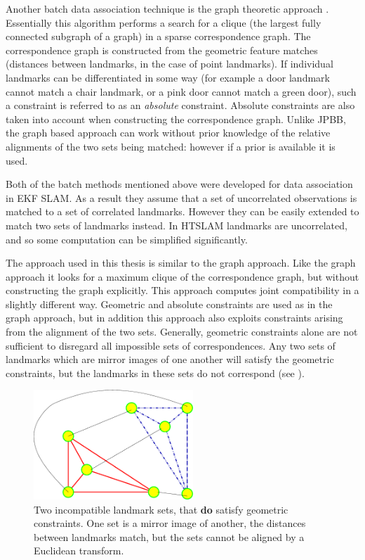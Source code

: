 Another batch data association technique is the graph theoretic
approach \cite{tardos02:_mappin_local_indoor_envir_using_sonar_data}.
Essentially this algorithm performs a search for a clique (the largest
fully connected subgraph of a graph) in a sparse correspondence graph.
The correspondence graph is constructed from the geometric feature
matches (distances between landmarks, in the case of point landmarks).
If individual landmarks can be differentiated in some way (for example
a door landmark cannot match a chair landmark, or a pink door cannot match
a green door), such a constraint is referred to as an {\it absolute}
constraint. Absolute constraints are also taken into account when
constructing the correspondence graph. Unlike JPBB, the graph based
approach can work without prior knowledge of the relative alignments
of the two sets being matched: however if a prior is available it is
used.

Both of the batch methods mentioned above were developed for data
association in EKF SLAM. As a result they assume that a set of
uncorrelated observations is matched to a set of correlated
landmarks. However they can be easily extended to match two sets of
landmarks instead. In HTSLAM landmarks are uncorrelated, and so some
computation can be simplified significantly.

The approach used in this thesis is similar to the graph approach.
Like the graph approach it looks for a maximum clique of the
correspondence graph, but without constructing the graph explicitly.
This approach computes joint compatibility in a slightly different
way. Geometric and absolute constraints are used as in the graph
approach, but in addition this approach also exploits constraints
arising from the alignment of the two sets. Generally, geometric
constraints alone are not sufficient to disregard all impossible sets
of correspondences. Any two sets of landmarks which are mirror images
of one another will satisfy the geometric constraints, but the
landmarks in these sets do not correspond (see
).

\begin{figure}[htbp]
  \centering
  \includegraphics[width=6cm]{Pics/fig_mirror_sets}
  \caption[Reflection and alignment]{Two incompatible landmark sets, that {\bf do} satisfy
    geometric constraints. One set is a mirror image of another, the
    distances between landmarks match, but the sets cannot be aligned
    by a Euclidean transform.
}
  \label{fig:mirror_sets}
\end{figure}

